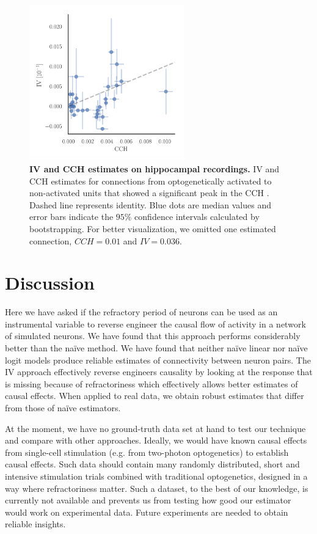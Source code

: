 \documentclass[11pt]{article}
\begin{document}
\begin{figure}
\makeatletter
\renewcommand\p@subfigure{}
\makeatother
\centering
\includegraphics[width=0.6\textwidth]{Optodata_comparisonIV_CCH.pdf}
\caption{\textbf{IV and CCH estimates on hippocampal recordings.}
IV and CCH estimates for connections from optogenetically activated to non-activated units that showed a significant peak in the CCH \citep{English2017}.
Dashed line represents identity.
Blue dots are median values and error bars indicate the $95$\% confidence intervals calculated by bootstrapping.
For better visualization, we omitted one estimated connection, $CCH = 0.01$ and $IV = 0.036$.
}
\label{fig:optodata}
 \end{figure}
\FloatBarrier

\section{Discussion}
Here we have asked if the refractory period of neurons can be used as an instrumental variable to reverse engineer the causal flow of activity in a network of simulated neurons. 
We have found that this approach performs considerably better than the na\"ive method. 
We have found that neither na\"ive linear nor na\"ive logit models produce reliable estimates of connectivity between neuron pairs. 
The IV approach effectively reverse engineers causality by looking at the response that is missing because of refractoriness which effectively allows better estimates of causal effects. When applied to real data, we obtain robust estimates that differ from those of na\"ive estimators.

At the moment, we have no ground-truth data set at hand to test our technique and compare with other approaches. 
Ideally, we would have known causal effects from single-cell stimulation (e.g. from two-photon optogenetics) to establish causal effects. 
Such data should contain many randomly distributed, short and intensive stimulation trials combined with traditional optogenetics, designed in a way where refractoriness matter. 
Such a dataset, to the best of our knowledge, is currently not available and prevents us from testing how good our estimator would work on experimental data. 
Future experiments are needed to obtain reliable insights. 
\end{document}
